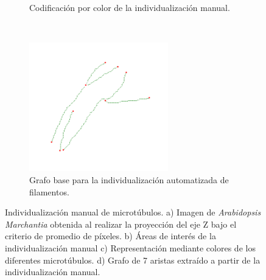\begin{figure}[h!]
\begin{subfigure}[t]{0.49\textwidth}
        \caption{Codificaci\'on por color de la individualizaci\'on manual.}
        \label{fig:field3t0filtered2-indivManual}
    \end{subfigure}
    ~
    \begin{subfigure}[t]{0.49\textwidth}
        \centering
        \includegraphics[height=2.2in]{benchImages/field3-t0-2cellBcrop-filtered-2-graph-thick.png}
        \caption{Grafo base para la individualizaci\'on automatizada de filamentos.}
        \label{fig:field3t0filtered2-graph}
    \end{subfigure}
    \caption[Individualizaci\'on manual de microt\'ubulos para la muestra MT-C.]{Individualizaci\'on manual de microt\'ubulos. a) Imagen de {\it Arabidopsis Marchantia} obtenida al realizar la proyecci\'on del eje Z bajo el criterio de promedio de p\'ixeles. b) \'Areas de inter\'es de la individualizaci\'on manual c) Representaci\'on mediante colores de los diferentes microt\'ubulos. d) Grafo de 7 aristas extra\'ido a partir de la individualizaci\'on manual.}
    \label{fig:field3t0filtered2}
\end{figure}

